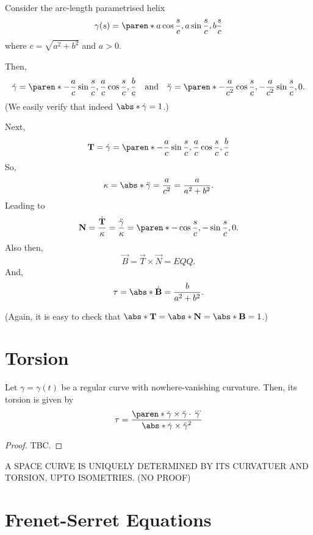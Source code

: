 \documentclass[11pt]{penrose}
\newcommand{\vT}{\vec{T}}
\newcommand{\vN}{\vec{N}}
\newcommand{\vB}{\vec{B}}
\newcommand{\missing}[1]{{\color{red}#1}}
\begin{document}
\begin{negg}
    Consider the arc-length parametrised helix
    \begin{equation}
        \gamma(s) = \paren*{ a \cos\frac{s}{c}, a\sin\frac{s}{c}, b\frac{s}{c} }
    \end{equation}
    where $c = \sqrt{a^2 + b^2}$ and $a > 0$.

    Then,
    \begin{equation}
        \dot{\gamma} = \paren*{ -\frac{a}{c} \sin\frac{s}{c}, \frac{a}{c} \cos\frac{s}{c}, \frac{b}{c} }
        \quad\text{and}\quad
        \ddot{\gamma} = \paren*{ -\frac{a}{c^2} \cos\frac{s}{c}, -\frac{a}{c^2} \sin\frac{s}{c}, 0 }.
    \end{equation}
    (We easily verify that indeed $\abs*{\dot{\gamma}} = 1$.)

    Next,
    \begin{equation}
        \vT = \dot{\gamma} = \paren*{ -\frac{a}{c} \sin\frac{s}{c}, \frac{a}{c} \cos\frac{s}{c}, \frac{b}{c} }
    \end{equation}
    So,
    \begin{equation}
        \kappa = \abs*{\ddot{\gamma}} = \frac{a}{c^2} = \frac{a}{a^2 + b^2}.
    \end{equation}
    Leading to
    \begin{equation}
        \vN = \frac{\dot{\vT}}{\kappa} = \frac{\ddot{\gamma}}{\kappa} = \paren*{ -\cos\frac{s}{c}, -\sin\frac{s}{c}, 0 }.
    \end{equation}
    Also then,
    \begin{equation}
        \vB = \vT \times \vN = EQQ.
    \end{equation}
    And,
    \begin{equation}
        \tau = \abs*{\dot{\vB}} = \frac{b}{a^2 + b^2}.
    \end{equation}
    
    (Again, it is easy to check that $\abs*{\vT} = \abs*{\vN} = \abs*{\vB} = 1$.)
\end{negg}

\section{Torsion}

\begin{nthm}
    Let $\gamma = \gamma(t)$ be a regular curve with nowhere-vanishing curvature. Then, its torsion is given by
    \begin{equation}
        \tau
        = \frac{\paren*{\dot{\gamma} \times \ddot{\gamma}} \cdot \dddot{\gamma}}{\abs*{\dot{\gamma} \times \ddot{\gamma}}^2}
    \end{equation}
\end{nthm}
\begin{proof}
    TBC.
\end{proof}

\missing{\begin{nthm}
    A SPACE CURVE IS UNIQUELY DETERMINED BY ITS CURVATUER AND TORSION, UPTO ISOMETRIES. (NO PROOF)
\end{nthm}}

\section{Frenet-Serret Equations}
\end{document}
